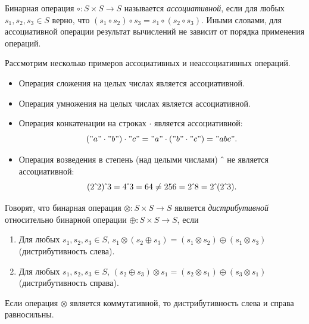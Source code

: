 \begin{definition}
    Бинарная операция $\circ: S \times S \to S$ называется \emph{ассоциативной}, если для любых $s_1, s_2, s_3 \in S$ верно, что $(s_1 \circ s_2) \circ s_3 = s_1 \circ (s_2 \circ s_3)$.
    Иными словами, для ассоциативной операции результат вычислений не зависит от порядка применения операций.
\end{definition}

\begin{example} Рассмотрим несколько примеров ассоциативных и неассоциативных операций.
    \begin{itemize}
        \item Операция сложения на целых числах является ассоциативной.
        \item Операция умножения на целых числах является ассоциативной.
        \item Операция конкатенации на строках $\cdot$ является ассоциативной:
              \[("a" \cdot "b") \cdot "c"  = "a" \cdot ("b" \cdot "c") = "abc".\]
        \item Операция возведения в степень (над целыми числами) $\hat{\mkern6mu}$ не является ассоциативной:
              \[(2\hat{\mkern6mu}2)\hat{\mkern6mu}3 = 4 \hat{\mkern6mu} 3 = 64 \neq 256 = 2 \hat{\mkern6mu} 8 = 2\hat{\mkern6mu}(2\hat{\mkern6mu}3).\]
    \end{itemize}
\end{example}

\begin{definition}
    Говорят, что бинарная операция $\otimes: S \times S \to S$ является \emph{дистрибутивной} относительно бинарной операции $\oplus: S \times S \to S$, если
    \begin{enumerate}
        \item Для любых $s_1, s_2, s_3 \in S$, $s_1 \otimes (s_2 \oplus s_3) = (s_1 \otimes s_2) \oplus (s_1 \otimes s_3)$ (дистрибутивность слева).
        \item Для любых $s_1, s_2, s_3 \in S$, $(s_2 \oplus s_3) \otimes s_1 = (s_2 \otimes s_1) \oplus (s_3 \otimes s_1)$ (дистрибутивность справа).
    \end{enumerate}
    Если операция $\otimes$ является коммутативной, то дистрибутивность слева и справа равносильны.
\end{definition}

